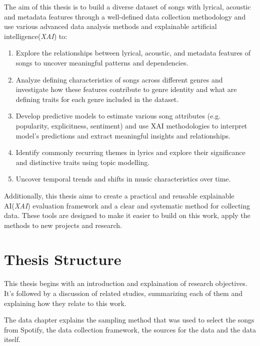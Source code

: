 The aim of this thesis is to build a diverse dataset of songs with lyrical,
acoustic and metadata features through a well-defined data collection
methodology and use various advanced data analysis methods and explainable
artificial intelligence(\textit{XAI}) to:

\begin{enumerate}
  \item Explore the relationships between lyrical, acoustic, and metadata
    features of songs to uncover meaningful patterns and dependencies.
  \item Analyze defining characteristics of songs across different genres and
    investigate how these features contribute to genre identity and what are
    defining traits for each genre included in the dataset.
  \item Develop predictive models to estimate various song attributes (e.g.
    popularity, explicitness, sentiment) and use XAI methodologies to interpret
    model's predictions and extract meaningful insights and relationships.
  \item Identify commonly recurring themes in lyrics and explore their
    significance and distinctive traits using topic modelling. 
  \item Uncover temporal trends and shifts in music characteristics over time.
\end{enumerate}

Additionally, this thesis aims to create a practical and reusable explainable
AI(\textit{XAI}) evaluation framework and a clear and systematic method for
collecting data. These tools are designed to make it easier to build on this
work, apply the methods to new projects and research.




\section{Thesis Structure}
\label{sec:thesisstructure}

This thesis begins with an introduction and explaination of research objectives.
It's followed by a discussion of related studies, summarizing each of them and
explaining how  they relate to this work. 

The data chapter explains the sampling method that was used to select the songs
from Spotify, the data collection framework, the sources for the data and the
data itself.

